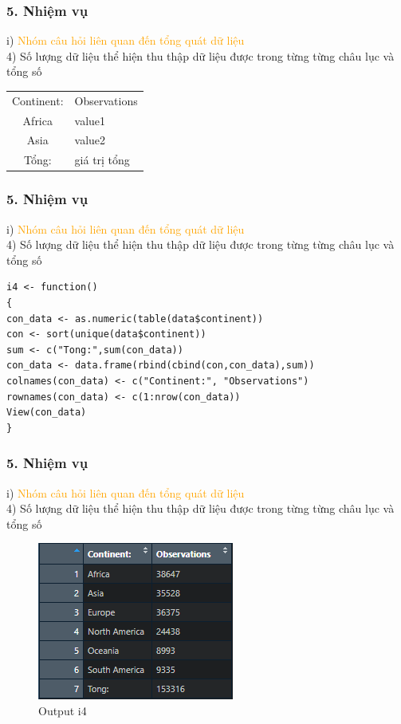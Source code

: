 \documentclass[english,10pt,table]{beamer}
\begin{document}
\begin{frame}[fragile]
\frametitle{5.  Nhiệm vụ}
	i) \textcolor{orange}{Nhóm câu hỏi liên quan đến tổng quát dữ liệu}\\
	4) Số lượng dữ liệu thể hiện thu thập dữ liệu được trong từng từng châu lục và tổng số
		\begin{center}
			\begin{tabular}{ c l }
				Continent: & Observations \\ 
				Africa & value1  \\ 
				Asia & value2 \\
				Tổng: & giá trị tổng
			\end{tabular}
		\end{center}
\end{frame}

\begin{frame}[fragile]
\frametitle{5.  Nhiệm vụ}
	i) \textcolor{orange}{Nhóm câu hỏi liên quan đến tổng quát dữ liệu}\\
	4) Số lượng dữ liệu thể hiện thu thập dữ liệu được trong từng từng châu lục và tổng số
			\begin{lstlisting}[frame=single]  
i4 <- function()
{
con_data <- as.numeric(table(data$continent))
con <- sort(unique(data$continent))
sum <- c("Tong:",sum(con_data))
con_data <- data.frame(rbind(cbind(con,con_data),sum))
colnames(con_data) <- c("Continent:", "Observations")
rownames(con_data) <- c(1:nrow(con_data))
View(con_data)
}
	\end{lstlisting}
\end{frame}

\begin{frame}[fragile]
\frametitle{5.  Nhiệm vụ}
	i) \textcolor{orange}{Nhóm câu hỏi liên quan đến tổng quát dữ liệu}\\
	4) Số lượng dữ liệu thể hiện thu thập dữ liệu được trong từng từng châu lục và tổng số
\begin{figure}[h!]
	\begin{center}
		    \includegraphics[scale = 0.7]{Images/I/I4.png}
		            \caption{Output i4}
		\end{center}
		\end{figure}
\end{frame}
\end{document}
